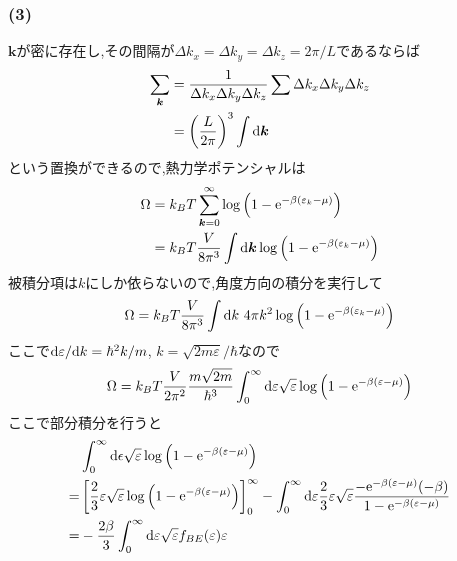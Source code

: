 \subsubsection*{(3)}
${\bm k}$が密に存在し,その間隔が$\Delta k_x=\Delta k_y=\Delta k_z=2\pi/L$であるならば
\begin{align}
  \begin{split}
    \sum_{\bm k}&=\frac{1}{\Delta k_x\Delta k_y\Delta k_z}\sum\Delta k_x\Delta k_y\Delta k_z\\
    &=\left(\frac{L}{2\pi}\right)^3\int{\rm d}{\bm k}
  \end{split}
\end{align}
という置換ができるので,熱力学ポテンシャルは
\begin{align}
  \begin{split}
    \Omega&=k_BT\sum_{{\bm k}=0}^\infty\log\left(1-{\rm e}^{-\beta(\varepsilon_k-\mu)}\right)\\
    &=k_BT\frac{V}{8\pi^3}\int{\rm d}{\bm k}\log\left(1-{\rm e}^{-\beta(\varepsilon_k-\mu)}\right)\\
  \end{split}
\end{align}
被積分項は$k$にしか依らないので,角度方向の積分を実行して
\begin{align}
  \begin{split}
    \Omega&=k_BT\frac{V}{8\pi^3}\int{\rm d}k\ 4\pi k^2\log\left(1-{\rm e}^{-\beta(\varepsilon_k-\mu)}\right)\\
  \end{split}
\end{align}
ここで${\rm d}\varepsilon/{\rm d}k=\hbar^2k/m$, $k=\sqrt{2m\varepsilon}/\hbar$なので
\begin{align}
  \begin{split}
    \Omega&=k_BT\frac{V}{2\pi^2}\frac{m\sqrt{2m}}{\hbar^3}\int_0^\infty{\rm d}\varepsilon\sqrt{\varepsilon}\log\left(1-{\rm e}^{-\beta(\varepsilon-\mu)}\right)\\
  \end{split}
\end{align}
ここで部分積分を行うと
\begin{align}
  \begin{split}
    &\int_0^\infty{\rm d}\epsilon\sqrt{\varepsilon}\log\left(1-{\rm e}^{-\beta(\varepsilon-\mu)}\right)\\
    =&\left[\frac{2}{3}\varepsilon\sqrt{\varepsilon}\log\left(1-{\rm e}^{-\beta(\varepsilon-\mu)}\right)\right]_0^\infty-\int_0^\infty{\rm d}\varepsilon\frac{2}{3}\varepsilon\sqrt{\varepsilon}\frac{-{\rm e}^{-\beta(\varepsilon-\mu)}(-\beta)}{1-{\rm e}^{-\beta(\varepsilon-\mu)}}\\
    =&-\frac{2\beta}{3}\int_0^\infty{\rm d}\varepsilon\sqrt{\varepsilon}f_{BE}(\varepsilon)\varepsilon
  \end{split}
\end{align}
